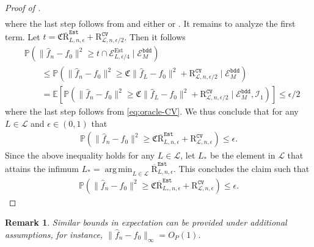 \documentclass[12pt]{article}
\DeclareMathOperator*{\argmin}{arg\,min}
\newtheorem{remark}{Remark}[section]
\begin{document}
\begin{appendices}
\begin{proof}[Proof of ]
\begin{equation*}
\begin{aligned}
\end{aligned}
\end{equation*}
where the last step follows from  and either  or . It remains to analyze the first term. Let $ t = \mathfrak{C}\overline{\mathrm{R}}_{L,n,\epsilon}^{\mathtt{Est}} + \mathrm{R}_{\mathcal{L}, n,\epsilon/2}^{\mathtt{CV}}$. Then it follows
\begin{align*}
    &\mathbb{P}(\|\widehat f_n - f_0\|^2 \ge t \cap \mathcal{E}^{\mathrm{Est}}_{L,\epsilon/4} \mid  \mathcal{E}^{\mathtt{bdd}}_M) \\
    &\qquad \le \mathbb{P}(\|\widehat f_n - f_0\|^2 \ge   \mathfrak{C}\|\widehat{f}_L-f_0\|^2  + \mathrm{R}_{\mathcal{L}, n, \epsilon/2}^{\mathtt{CV}} \mid  \mathcal{E}^{\mathtt{bdd}}_M) \\
    &\qquad = \mathbb{E}[\mathbb{P}(\|\widehat f_n - f_0\|^2 \ge  \mathfrak{C}\|\widehat{f}_L-f_0\|^2  + \mathrm{R}_{\mathcal{L}, n, \epsilon/2}^{\mathtt{CV}} \mid  \mathcal{E}^{\mathtt{bdd}}_M, \mathcal{I}_1)] \le \epsilon/2
\end{align*}
where the last step follows from \eqref{eq:oracle-CV}. We thus conclude that for any $L \in \mathcal{L}$ and $\epsilon \in (0,1)$ that 
\begin{align*}
    \mathbb{P}(\|\widehat f_n - f_0\|^2 \ge \mathfrak{C}\overline{\mathrm{R}}_{L,n,\epsilon}^{\mathtt{Est}}+ \mathrm{R}_{\mathcal{L}, n,\epsilon}^{\mathtt{CV}}) \le \epsilon.
\end{align*}
Since the above inequality holds for any $L \in \mathcal{L}$, let $L_*$ be the element in $\mathcal{L}$ that attains the infimum $L_* = \argmin_{L \in \mathcal{L}}\overline{\mathrm{R}}_{L,n,\epsilon}^{\mathtt{Est}}$. This concludes the claim such that
\begin{align*}
    \mathbb{P}(\|\widehat f_n - f_0\|^2 \ge \mathfrak{C}\overline{\mathrm{R}}_{L_*,n,\epsilon}^{\mathtt{Est}}+ \mathrm{R}_{\mathcal{L}, n,\epsilon}^{\mathtt{CV}}) \le \epsilon.
\end{align*}

\end{proof}
\begin{remark}
    Similar bounds in expectation can be provided under additional assumptions, for instance, $\|\widehat f_n - f_0\|_\infty = O_P(1)$.
\end{remark}


\end{appendices}
\end{document}
